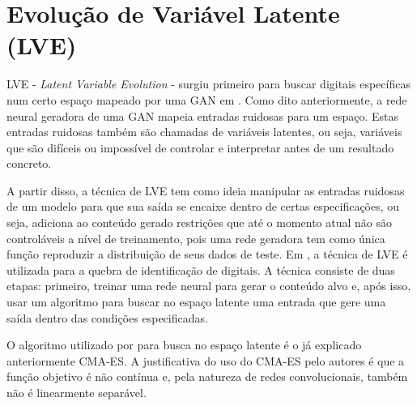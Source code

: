 

\section{Evolução de Variável Latente (LVE)}

LVE - \emph{Latent Variable Evolution} - surgiu primeiro para buscar digitais específicas num certo espaço mapeado por uma GAN em \cite{fingerprints}. Como dito anteriormente, a rede neural geradora de uma GAN mapeia entradas ruidosas para um espaço. Estas entradas ruidosas também são chamadas de variáveis latentes, ou seja, variáveis que são difíceis ou impossível de controlar e interpretar antes de um resultado concreto.

A partir disso, a técnica de LVE tem como ideia manipular as entradas ruidosas de um modelo para que sua saída se encaixe dentro de certas especificações, ou seja, adiciona ao conteúdo gerado restrições que até o momento atual não são controláveis a nível de treinamento, pois uma rede geradora tem como única função reproduzir a distribuição de seus dados de teste. Em \cite{fingerprints}, a técnica de LVE é utilizada para a quebra de identificação de digitais. A técnica consiste de duas etapas: primeiro, treinar uma rede neural para gerar o conteúdo alvo e, após isso, usar um algoritmo para buscar no espaço latente uma entrada que gere uma saída dentro das condições especificadas.

O algoritmo utilizado por \cite{fingerprints} para busca no espaço latente é o já explicado anteriormente CMA-ES. A justificativa do uso do CMA-ES pelo autores é que a função objetivo é não contínua e, pela natureza de redes convolucionais, também não é linearmente separável.



